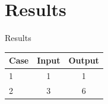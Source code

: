 \section{Results}
\begin{frame}{Results}
  \centering
  {\renewcommand{\arraystretch}{1.6}
  \begin{tabular}{@{}lcc@{}}
    \toprule
    Case & Input & Output \\
    \midrule
    1 & 1 & 1 \\
    2 & 3 & 6 \\
    \bottomrule
  \end{tabular}}
\end{frame}
